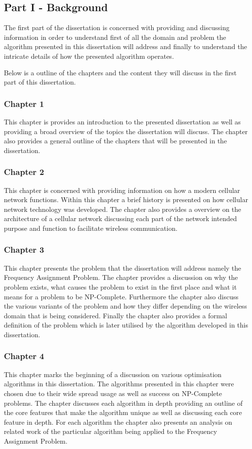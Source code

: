 \subsection{Part I - Background}
The first part of the dissertation is concerned with providing and discussing information in order to understand first of all the domain and problem the algorithm presented in this dissertation will address and finally to understand the intricate details of how the presented algorithm operates.

Below is a outline of the chapters and the content they will discuss in the first part of this dissertation.
\subsubsection{Chapter 1}
This chapter is provides an introduction to the presented dissertation as well as providing a broad overview of the topics the dissertation will discuss. The chapter also provides a general outline of the chapters that will be presented in the dissertation.
\subsubsection{Chapter 2}
This chapter is concerned with providing information on how a modern cellular network functions. Within this chapter a brief history is presented on how cellular network technology was developed. The chapter also provides a overview on the architecture of a cellular network discussing each part of the network intended purpose and function to facilitate wireless communication.
\subsubsection{Chapter 3}
This chapter presents the problem that the dissertation will address namely the Frequency Assignment Problem. The chapter provides a discussion on why the problem exists, what causes the problem to exist in the first place and what it means for a problem to be NP-Complete. Furthermore the chapter also discuss the various variants of the problem and how they differ depending on the wireless domain that is being considered. Finally the chapter also provides a formal definition of the problem which is later utilised by the algorithm developed in this dissertation.
\subsubsection{Chapter 4}
This chapter marks the beginning of a discussion on various optimisation algorithms in this dissertation. The algorithms presented in this chapter were chosen due to their wide spread usage as well as success on NP-Complete problems. The chapter discusses each algorithm in depth providing an outline of the core features that make the algorithm unique as well as discussing each core feature in depth. For each algorithm the chapter also presents an analysis on related work of the particular algorithm being applied to the Frequency Assignment Problem. 
